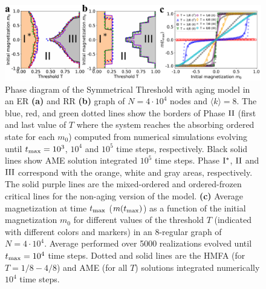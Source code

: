 \begin{figure}
        \centering \captionsetup{font=sf}
        \includegraphics[width=\textwidth]{Figs/Aging_STM/FIG5_THESIS.pdf}
        \caption[Phase diagram modified by aging.]{\label{ER_REG_PDAGING} Phase diagram of the Symmetrical Threshold with aging model in an ER \textbf{(a)} and RR \textbf{(b)} graph of $N = 4 \cdot 10^4$ nodes and $\langle k \rangle = 8$. The blue, red, and green dotted lines show the borders of Phase ${\rm II}$ (first and last value of $T$ where the system reaches the absorbing ordered state for each $m_0$) computed from numerical simulations evolving until $t_{\rm max} = 10^3$, $10^4$ and $10^5$ time steps, respectively. Black solid lines show AME solution integrated $10^5$ time steps. Phase ${\rm I}^{*}$, ${\rm II}$ and ${\rm III}$ correspond with the orange, white and gray areas, respectively. The solid purple lines are the mixed-ordered and ordered-frozen critical lines for the non-aging version of the model. \textbf{(c)} Average magnetization at time $t_{\rm max}$ ($m(t_{\rm max})$) as a function of the initial magnetization $m_0$ for different values of the threshold $T$ (indicated with different colors and markers) in an 8-regular graph of $N = 4 \cdot 10^4$. Average performed over 5000 realizations evolved until $t_{\rm max} = 10^4$ time steps. Dotted and solid lines are the HMFA (for $T = 1/8 - 4/8$) and AME (for all $T$) solutions integrated numerically $10^4$ time steps.}
\end{figure}

